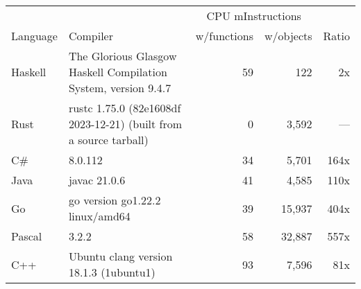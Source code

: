 \documentclass{article}
\begin{document}
      \begin{tabularx}{\linewidth}{lXrrr}
      \toprule
        & & \multicolumn{2}{c}{CPU mInstructions} & \\
        Language & Compiler & w/functions & w/objects & Ratio \\
      \midrule
    Haskell & The Glorious Glasgow Haskell Compilation System, version 9.4.7 & 59 & 122 & 2x \\
Rust & rustc 1.75.0 (82e1608df 2023-12-21) (built from a source tarball) & 0 & 3,592 & --- \\
C\# & 8.0.112 & 34 & 5,701 & 164x \\
Java & javac 21.0.6 & 41 & 4,585 & 110x \\
Go & go version go1.22.2 linux/amd64 & 39 & 15,937 & 404x \\
Pascal & 3.2.2 & 58 & 32,887 & 557x \\
C++ & Ubuntu clang version 18.1.3 (1ubuntu1) & 93 & 7,596 & 81x \\

      \bottomrule
      \end{tabularx}
      
\end{document}
